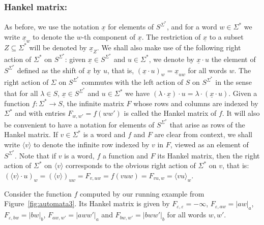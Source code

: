 \documentclass{lmcs}
\numberwithin{theorem}{section}
\begin{document}
\subsubsection*{\textbf{Hankel matrix:}} As before, 
 we use the notation $\underline{x}$ for elements of $S^{\Sigma^*}$, and for a word $w \in \Sigma^*$ we write $\underline{x}_w$ to denote the $w$-th component of $\underline{x}$. The restriction of $\underline{x}$ to a subset $Z \subseteq \Sigma^*$ will be denoted by $\underline{x}_Z$. We shall also make use of the following right action of $\Sigma^*$ on $S^{\Sigma^*}$: given $\underline{x} \in S^{\Sigma^*}$ and $u \in \Sigma^*$, we denote by $\underline{x}\cdot u$ the element of $S^{\Sigma^*}$ defined as the shift of $\underline{x}$ by $u$, that is, $(\underline{x}\cdot u)_w = \underline{x}_{uw}$ for all words $w$. The right action of $\Sigma$ on $S^{\Sigma^*}$ commutes with the left action of $S$ on $S^{\Sigma^*}$ in the sense that for all $\lambda \in S$, $\underline{x} \in S^{\Sigma^*}$ and $u \in \Sigma^*$ we have $(\lambda \cdot \underline{x}) \cdot u = \lambda \cdot (\underline{x} \cdot u)$. Given a function $f: \Sigma^* \to S$, the infinite matrix $F$ whose rows and columns are indexed by $\Sigma^*$ and with entries $F_{w,w'} = f(ww')$ is called the Hankel matrix of $f$.  It will also be convenient to have a notation for elements of $S^{\Sigma^*}$ that arise as rows of the Hankel matrix. If $v \in \Sigma^*$ is a word and $f$ and $F$ are clear from context, we shall write $\langle v \rangle$ to denote the infinite row indexed by $v$ in $F$, viewed as an element of $S^{\Sigma^*}$. Note that if $v$ is a word, $f$ a function and $F$ its Hankel matrix, then the right action of $\Sigma^*$ on $\langle v \rangle$ corresponds to the obvious right action of $\Sigma^*$ on $v$, that is: $(\langle v \rangle \cdot u)_w = (\langle v \rangle)_{uw}  = F_{v,uw} = f(vuw) = F_{vu,w} =\langle vu \rangle_{w}$. 

\begin{exa}
Consider the function $f$ computed by our running example from Figure~\ref{fig:automata3}. Its Hankel matrix is given by $F_{\varepsilon, \varepsilon} = -\infty$, $F_{\varepsilon, aw} = |aw|_a$, $F_{\varepsilon, bw} = |bw|_b$, $F_{aw, w'} = |aww'|_a$ and $F_{bw, w'} = |bww'|_b$ for all words $w,w'$.    
\end{exa}
\end{document}
